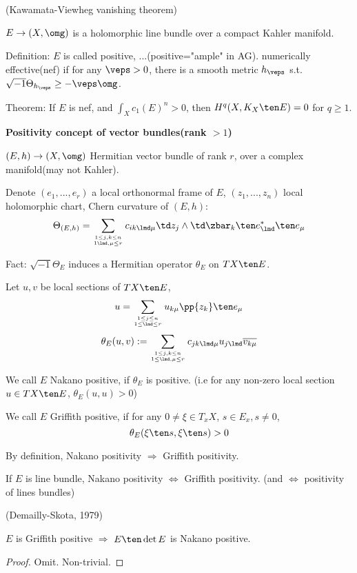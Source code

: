 \begin{rem}(Kawamata-Viewheg vanishing theorem)

$E\to (X,\omg)$ is a holomorphic line bundle over a compact Kahler manifold.

Definition: $E$ is called positive, ...(positive="ample" in AG).
numerically effective(nef) if for any $\veps>0$, there is a smooth metric $h_\veps$
s.t. $\sqrt{-1}\Theta_{h_\veps}\geq -\veps\omg$.

Theorem: If $E$ is nef, and $\int_X c_1(E)^n>0$, then
$H^{q}(X,K_X\ten E)=0$ for $q\geq 1$.
\end{rem}

\textbf{Positivity concept of vector bundles(rank $>1$)}

$(E,h)\to (X,\omg)$ Hermitian vector bundle of rank $r$,
over a complex manifold(may not Kahler).

Denote $(e_1,...,e_r)$ a local orthonormal frame of $E$,
$(z_1,...,z_n)$ local holomorphic chart,
Chern curvature of $(E,h)$:
$$
  \Theta_{(E,h)}
= \sum_{1\leq j,k\leq n\atop 1\lmd,\mu\leq r}
    c_{ik\lmd\mu}\td z_j\wedge\td\zbar_k\ten e_\lmd^*\ten e_\mu
$$

Fact: $\sqrt{-1}\Theta_E$ induces a Hermitian operator $\theta_E$
on $TX\ten E$.

Let $u,v$ be local sections of $TX\ten E$,
$$u=\sum_{1\leq j\leq n\atop1\leq\lmd\leq r}
u_{k\mu}\pp{z_k}\ten e_\mu
$$
$$
  \theta_{E}(u,v)
:=
  \sum_{1\leq j,k\leq n\atop 1\leq\lmd,\mu\leq r}
    c_{jk\lmd\mu} u_{j\lmd}\overline{v_{k\mu}}
$$

\begin{definition}
We call $E$ Nakano positive, if $\theta_E$ is positive.
(i.e for any non-zero local section $u\in TX\ten E$, $\theta_E(u,u)>0$)

We call $E$ Griffith positive, if for any
$0\neq \xi\in T_xX$, $s\in E_x,s\neq 0$,
$$\theta_E(\xi\ten s,\xi\ten s)>0$$
\end{definition}

\begin{rem}
By definition, Nakano positivity $\Rightarrow$ Griffith positivity.

If $E$ is line bundle,
Nakano positivity $\iff$ Griffith positivity.
(and $\iff$ positivity of lines bundles)
\end{rem}

\begin{thm}(Demailly-Skota, 1979)

$E$ is Griffith positive $\Rightarrow$ $E\ten \det E$ is Nakano positive.
\end{thm}
\begin{proof}
  Omit. Non-trivial.
\end{proof}

